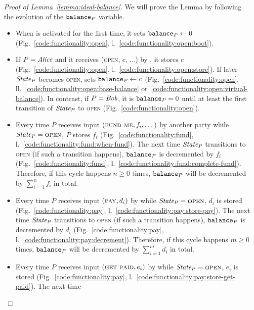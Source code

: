 \begin{proof}[Proof of Lemma~\ref{lemma:ideal-balance}]
  We will prove the Lemma by following the evolution of the $\texttt{balance}_{P}$
  variable.
  \begin{itemize}
    \item When \fchan is activated for the first time, it sets $\texttt{balance}_{P}
    \gets 0$ (Fig.~\ref{code:functionality:open},
    l.~\ref{code:functionality:open:boot}). \item If $P = \mathit{Alice}$ and it
    receives (\textsc{open}, $c$, $\dots$) by \environment, it stores $c$
    (Fig.~\ref{code:functionality:open},
    l.~\ref{code:functionality:open:store}). If later $\itistate_P$ becomes
    \textsc{open}, \fchan sets $\texttt{balance}_{P} \gets c$
    (Fig.~\ref{code:functionality:open},
    ll.~\ref{code:functionality:open:base-balance}
    or~\ref{code:functionality:open:virtual-balance}). In contrast, if $P =
    \mathit{Bob}$, it is $\texttt{balance}_{P} = 0$ until at least the first transition of
    $\itistate_P$ to \textsc{open} (Fig.~\ref{code:functionality:open}).
    \item Every time $P$ receives input $(\textsc{fund me}, f_i, \dots)$ by
    another party while $\itistate_P = \textsc{open}$, $P$ stores $f_i$
    (Fig.~\ref{code:functionality:fund},
    l.~\ref{code:functionality:fund:when-fund}). The next time $\itistate_P$
    transitions to \textsc{open} (if such a transition happens), $\texttt{balance}_{P}$
    is decremented by $f_i$ (Fig.~\ref{code:functionality:fund},
    l.~\ref{code:functionality:fund:complete-fund}). Therefore, if this cycle
    happens $n \geq 0$ times, $\texttt{balance}_{P}$ will be decremented by
    $\sum\limits_{i=1}^n f_i$ in total.
    \item Every time $P$ receives input $(\textsc{pay}, d_i)$ by \environment
    while $\itistate_P = \textsc{open}$, $d_i$ is stored
    (Fig.~\ref{code:functionality:pay},
    l.~\ref{code:functionality:pay:store-pay}). The next time
    $\itistate_P$ transitions to \textsc{open} (if such a transition happens),
    $\texttt{balance}_{P}$ is decremented by $d_i$
    (Fig.~\ref{code:functionality:pay},
    l.~\ref{code:functionality:pay:decrement}). Therefore, if this cycle
    happens $m \geq 0$ times, $\texttt{balance}_{P}$ will be decremented by
    $\sum\limits_{i=1}^m d_i$ in total.
    \item Every time $P$ receives input $(\textsc{get paid}, e_i)$ by
    \environment while $\itistate_P = \textsc{open}$, $e_i$ is stored
    (Fig.~\ref{code:functionality:pay},
    l.~\ref{code:functionality:pay:store-get-paid}). The next time

\end{itemize}
\end{proof}

